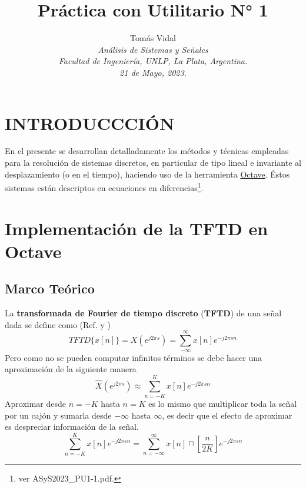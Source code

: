 \documentclass[letterpaper, 10 pt, conference]{ieeeconf}  %
\title{\LARGE \bf Pr\'actica con Utilitario N° 1}
\author{
  Tom\'as Vidal\\
  {\it An\'alisis de Sistemas y Se\~{n}ales}\\
  {\it Facultad de Ingenier\'ia, UNLP, La Plata, Argentina.}\\
  {\it 21 de Mayo, 2023.}
}
\begin{document}
\maketitle
\thispagestyle{empty}
\pagestyle{empty}

\section{INTRODUCCCI\'ON}
En el presente se desarrollan detalladamente los m\'etodos y t\'ecnicas empleadas para la resoluci\'on de sistemas discretos, en particular de tipo lineal e invariante al desplazamiento (o en el tiempo), haciendo uso de la herramienta \href{https://octave.org/}{Octave}. \'Estos sistemas est\'an descriptos en ecuaciones en diferencias\footnote{ver ASyS2023\_PU1-1.pdf.}.

\section{Implementaci\'on de la \textbf{TFTD} en Octave}
\subsection{Marco Te\'orico} \label{subsec:TFTD}
La \textbf{transformada de Fourier de tiempo discreto} (\textbf{TFTD}) de una se\~{n}al dada se define como (Ref. \cite{tftd_tp5} y \cite{tftd_teoria})
\[
  TFTD\{x[n]\} = X(e^{j2{\pi}s}) = \sum_{-\infty}^{\infty}{x[n]e^{-j2{\pi}sn}}
\]
Pero como no se pueden computar infinitos t\'erminos se debe hacer una aproximaci\'on de la siguiente manera
\[
  \hat{X}(e^{j2{\pi}s}) \approx \sum_{n=-K}^{K}{x[n]e^{-j2{\pi}sn}}
\]
Aproximar desde $n=-K$ hasta $n=K$ es lo mismo que multiplicar toda la se\~nal por un caj\'on y sumarla desde $-\infty$ hasta $\infty$, es decir que el efecto de aproximar es despreciar informaci\'on de la se\~nal.
\[
  \sum_{n=-K}^{K}{x[n]e^{-j2{\pi}sn}} = \sum_{n=-\infty}^{\infty}{x[n]\sqcap[\frac{n}{2K}]e^{-j2{\pi}sn}}
\]
\end{document}
